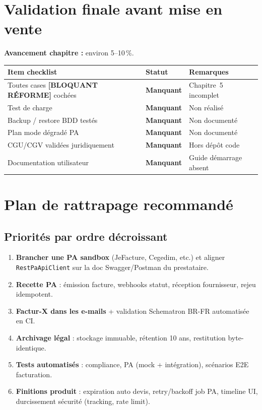 \documentclass[11pt,a4paper]{report}
\newcommand{\svc}[1]{\texttt{\small #1}}
\newcommand{\statmiss}{\textcolor{statno}{\textbf{Manquant}}}
\begin{document}
\chapter{Validation finale avant mise en vente}

\textbf{Avancement chapitre :} environ 5--10\,\%.

\begin{longtable}{@{}L{7.8cm}C{2.4cm}L{4.4cm}@{}}
    \toprule
    \textbf{Item checklist} & \textbf{Statut} & \textbf{Remarques} \\
    \midrule
    \endhead
    Toutes cases \textbf{[BLOQUANT RÉFORME]} cochées & \statmiss & Chapitre~5 incomplet \\
    Test de charge & \statmiss & Non réalisé \\
    Backup / restore BDD testés & \statmiss & Non documenté \\
    Plan mode dégradé PA & \statmiss & Non documenté \\
    CGU/CGV validées juridiquement & \statmiss & Hors dépôt code \\
    Documentation utilisateur & \statmiss & Guide démarrage absent \\
    \bottomrule
\end{longtable}

\chapter{Plan de rattrapage recommandé}

\section{Priorités par ordre décroissant}

\begin{enumerate}[leftmargin=1.5em, itemsep=6pt]
    \item \textbf{Brancher une PA sandbox} (JeFacture, Cegedim, etc.) et aligner \svc{RestPaApiClient} sur la doc Swagger/Postman du prestataire.
    \item \textbf{Recette PA} : émission facture, webhooks statut, réception fournisseur, rejeu idempotent.
    \item \textbf{Factur-X dans les e-mails} + validation Schematron BR-FR automatisée en CI.
    \item \textbf{Archivage légal} : stockage immuable, rétention 10 ans, restitution byte-identique.
    \item \textbf{Tests automatisés} : compliance, PA (mock + intégration), scénarios E2E facturation.
    \item \textbf{Finitions produit} : expiration auto devis, retry/backoff job PA, timeline UI, durcissement sécurité (tracking, rate limit).
\end{enumerate}
\end{document}
